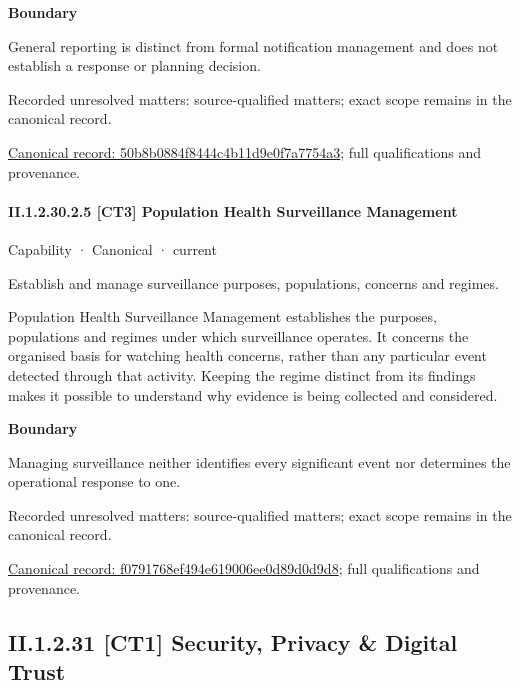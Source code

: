 \textbf{Boundary}



General reporting is distinct from formal notification management and does not establish a response or planning decision.


{\small Recorded unresolved matters: source-qualified matters; exact scope remains in the canonical record.}\par
{\footnotesize \href{../../../../continuum/strategy/capability/50b8b0884f8444c4b11d9e0f7a7754a3.md}{Canonical record: 50b8b0884f8444c4b11d9e0f7a7754a3}; full qualifications and provenance.}\par
\paragraph*{II.1.2.30.2.5 [CT3] Population Health Surveillance Management}
\label{navigation:II.1.2.30.2.5}

\label{element:f0791768ef494e619006ee0d89d0d9d8}
{\small Capability · Canonical · current}\par

Establish and manage surveillance purposes, populations, concerns and regimes.



Population Health Surveillance Management establishes the purposes, populations and regimes under which surveillance operates. It concerns the organised basis for watching health concerns, rather than any particular event detected through that activity. Keeping the regime distinct from its findings makes it possible to understand why evidence is being collected and considered.



\textbf{Boundary}



Managing surveillance neither identifies every significant event nor determines the operational response to one.


{\small Recorded unresolved matters: source-qualified matters; exact scope remains in the canonical record.}\par
{\footnotesize \href{../../../../continuum/strategy/capability/f0791768ef494e619006ee0d89d0d9d8.md}{Canonical record: f0791768ef494e619006ee0d89d0d9d8}; full qualifications and provenance.}\par
\subsection*{II.1.2.31 [CT1] Security, Privacy \& Digital Trust}
\label{navigation:II.1.2.31}

